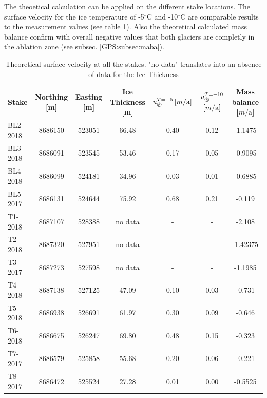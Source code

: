 The theoetical calculation can be applied on the different stake locations.
The surface velocity for the ice temperature of -5$^\circ$C and -10$^\circ$C are comparable results to the measurement values (see table \ref{GPS:tab:stakesvelocities}).
Also the theoretical calculated mass balance confirm with overall negative values that both glaciers are completly in the ablation zone (see subsec. \ref{GPS:subsec:maba}). 

\begin{table}[htb]
    \centering
    \footnotesize
    \caption{Theoretical surface velocity at all the stakes. "no data" translates into an absence of data for the Ice Thickness}
	\begin{tabular}{lcccccc}
	\toprule
Stake & Northing [m] & Easting [m] & Ice Thickness [m] & $u_\circledS^{T=-5}\,[m / \text{a}]$ & $u_\circledS^{T=-10}$ [$m / \text{a}$] & Mass balance [$m / \text{a}$]\\
\midrule
BL2-2018 & 8686150 & 523051 & 66.48 & 0.40 & 0.12 & -1.1475\\
BL3-2018 & 8686091 & 523545 & 53.46 & 0.17 & 0.05 & -0.9095\\
BL4-2018 & 8686099 & 524181 & 34.96 & 0.03 & 0.01 & -0.6885\\
BL5-2017 & 8686131 & 524644 & 75.92 & 0.68 & 0.21 & -0.119\\
T1-2018 & 8687107 & 528388 & no data & - & - & -2.108\\
T2-2018 & 8687320 & 527951 & no data & - & - & -1.42375\\
T3-2017 & 8687273 & 527598 & no data & - & - & -1.1985\\
T4-2018 & 8687138 & 527125 & 47.09 & 0.10 & 0.03 & -0.731\\
T5-2018 & 8686938 & 526691 & 61.97 & 0.30 & 0.09 & -0.646\\
T6-2018 & 8686675 & 526247 & 69.80 & 0.48 & 0.15 & -0.323\\
T7-2017 & 8686579 & 525858 & 55.68 & 0.20 & 0.06 & -0.221\\
T8-2017 & 8686472 & 525524 & 27.28 & 0.01 & 0.00 & -0.5525\\
\bottomrule
	\end{tabular}
	\label{GPS:tab:stakesvelocities}
\end{table}

